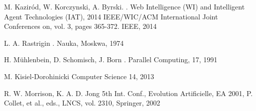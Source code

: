 \begin{thebibliography}{1}
M. Kaziród, W. Korczynski, A. Byrski.
.
\newblock  Web Intelligence (WI) and Intelligent Agent Technologies (IAT), 2014 IEEE/WIC/ACM International Joint Conferences on, vol. 3, pages 365-372. IEEE, 2014


L. A. Rastrigin
.
\newblock Nauka, Moskwa, 1974


 H. Mühlenbein, D. Schomisch, J. Born
.
\newblock Parallel Computing, 17, 1991


M. Kisiel-Dorohinicki
\newblock Computer Science 14, 2013


R. W. Morrison, K. A. D. Jong 
\newblock 5th Int. Conf., Evolution Artificielle, EA 2001, P. Collet, et al., eds., LNCS, vol. 2310, Springer, 2002



\end{thebibliography}
